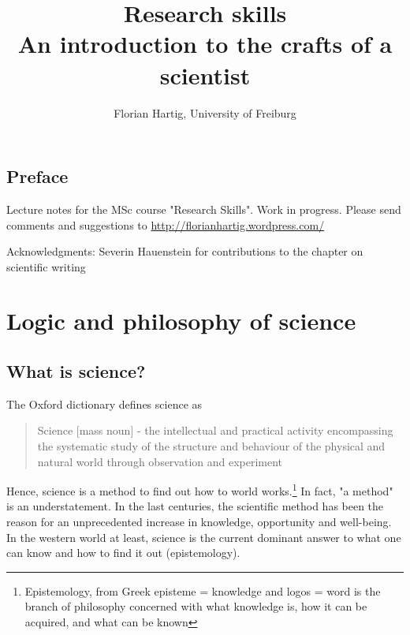 \documentclass{tufte-book}
\title{Research skills\\
\large{An introduction to the crafts of a scientist}}
\author{Florian Hartig, University of Freiburg}
\begin{document}
\let\cleardoublepage\clearpage
\maketitle
\newpage
\tableofcontents

\newpage


\section*{Preface}

Lecture notes for the MSc course "Research Skills". Work in progress. Please send comments and suggestions to \href{http://florianhartig.wordpress.com/}{http://florianhartig.wordpress.com/}


Acknowledgments: Severin Hauenstein for contributions to the chapter on scientific writing

\chapter{Logic and philosophy of science}

\section{What is science?}

The Oxford dictionary defines science as 

\begin{quote}
Science [mass noun] - the intellectual and practical activity encompassing the systematic study of the structure and behaviour of the physical and natural world through observation and experiment
\end{quote}

Hence, science is a method to find out how to world works.\footnote{Epistemology, from Greek episteme = knowledge and logos = word is the branch of philosophy concerned with what knowledge is, how it can be acquired, and what can be known} In fact, "a method" is an understatement. In the last centuries, the scientific method has been the reason for an unprecedented increase in knowledge, opportunity and well-being. In the western world at least, science is the current dominant answer to what one can know and how to find it out (epistemology). 
\end{document}
